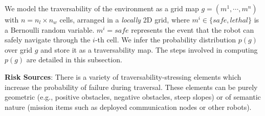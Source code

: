 \documentclass[letterpaper, 10pt, conference]{ieeeconf}      %
\newcommand{\ph}[1]{{\textbf{#1}:}} %
\newcommand{\rev}[1]{{\color{blue}#1}} %
\begin{document}
We model the traversability of the environment as a grid map $g=(m^1,\cdots,m^n)$ with $n = n_l \times n_w$ cells, arranged in a \textit{locally} 2D grid, where $m^i\in \{safe,lethal\}$ is a Bernoulli random variable.  $m^i=safe$ represents the event that the robot can safely navigate through the $i$-th cell. 
We infer the probability distribution $p(g)$ over grid $g$ and store it as a traversability map.
The steps involved in computing $p(g)$ are detailed in this subsection.




\ph{Risk Sources}
There is a variety of traversability-stressing elements which increase the probability of failure during traversal.
These elements can be purely geometric (e.g., positive obstacles, negative obstacles, steep slopes) or of semantic nature (mission items such as deployed communication nodes or other robots).
\end{document}
